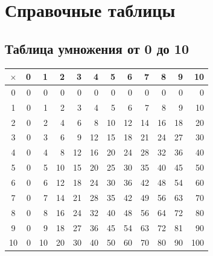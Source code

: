 \chapter*{Справочные таблицы}

\section*{Таблица умножения от 0 до 10}

\begingroup\small\renewcommand{\arraystretch}{1.4}\setlength{\tabcolsep}{5pt}

\begin{center}\begin{tabular}{|c|r|r|r|r|r|r|r|r|r|r|r|}\hline

\(\times\)&0&1&2&3&4&5&6&7&8&9&10\\\hline

0&0&0&0&0&0&0&0&0&0&0&0\\\hline

1&0&1&2&3&4&5&6&7&8&9&10\\\hline

2&0&2&4&6&8&10&12&14&16&18&20\\\hline

3&0&3&6&9&12&15&18&21&24&27&30\\\hline

4&0&4&8&12&16&20&24&28&32&36&40\\\hline

5&0&5&10&15&20&25&30&35&40&45&50\\\hline

6&0&6&12&18&24&30&36&42&48&54&60\\\hline

7&0&7&14&21&28&35&42&49&56&63&70\\\hline

8&0&8&16&24&32&40&48&56&64&72&80\\\hline

9&0&9&18&27&36&45&54&63&72&81&90\\\hline

10&0&10&20&30&40&50&60&70&80&90&100\\\hline

\end{tabular}\end{center}\endgroup

